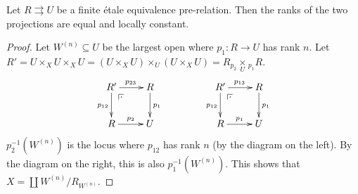  \begin{lemma}\label{lec13L:loc_const_rank}
   Let $R\rightrightarrows U$ be a finite \'etale equivalence pre-relation. Then the
   ranks of the two projections are equal and locally constant.
 \end{lemma}
 \begin{proof}

   Let $W^{(n)}\subseteq U$ be the largest open where $p_1:R\to U$ has rank $n$. Let
   $R'=U\times_X U\times_X U = (U\times_X U)\times_U (U\times_X
   U)=R{}_{p_2}\!\underset{U}{\times}{}_{p_1}R$.
   \[\xymatrix{
    R'\ar[r]^{p_{23}}\ar[d]_{p_{12}}\ar@{}[dr]|(.25)\pb & R\ar[d]^{p_1}\\
    R\ar[r]^{p_2} & U
   }\qquad\qquad
   \xymatrix{
    R'\ar[r]^{p_{13}}\ar[d]_{p_{12}} \ar@{}[dr]|(.25)\pb & R\ar[d]^{p_1}\\
    R\ar[r]^{p_1} & U }\] $p_2^{-1}(W^{(n)})$ is the locus where $p_{12}$ has rank $n$
   (by the diagram on the left). By the diagram on the right, this is also
   $p_1^{-1}(W^{(n)})$. This shows that $X=\coprod W^{(n)}/R_{W^{(n)}}$.
 \end{proof}

